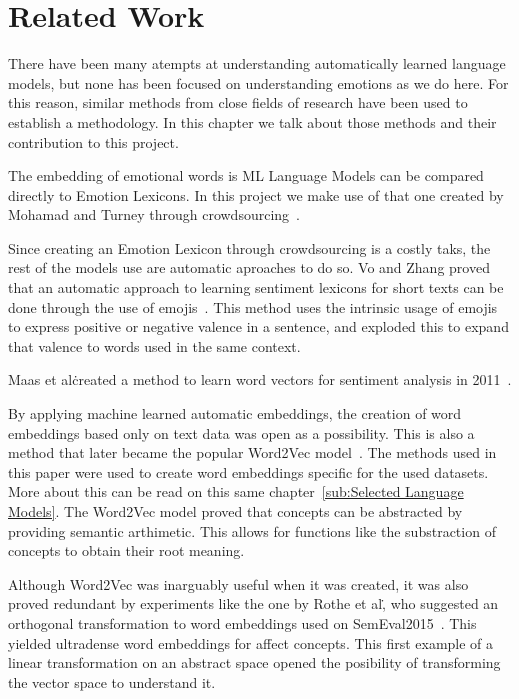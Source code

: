\chapter{Related Work}\label{chap:Related Work}

There have been many atempts at understanding automatically learned language models, but none has been focused on understanding emotions as we do here. For this reason, similar methods from close fields of research have been used to establish a methodology. In this chapter we talk about those methods and their contribution to this project.

The embedding of emotional words is ML Language Models can be compared directly to Emotion Lexicons. In this project we make use of that one created by Mohamad and Turney through crowdsourcing~\cite{mohammad2013crowdsourcing}.

Since creating an Emotion Lexicon through crowdsourcing is a costly taks, the rest of the models use are automatic aproaches to do so. Vo and Zhang proved that an automatic approach to learning sentiment lexicons for short texts can be done through the use of emojis~\cite{vo2016count}. This method uses the intrinsic usage of emojis to express positive or negative valence in a sentence, and exploded this to expand that valence to words used in the same context.

Maas et al\. created a method to learn word vectors for sentiment analysis in 2011~\cite{maas2011learning}.

By applying machine learned automatic embeddings, the creation of word embeddings based only on text data was open as a possibility. This is also a method that later became the popular Word2Vec model~\cite{mikolov2013word2vec}. The methods used in this paper were used to create word embeddings specific for the used datasets. More about this can be read on this same chapter~\ref{sub:Selected Language Models}. The Word2Vec model proved that concepts can be abstracted by providing semantic arthimetic. This allows for functions like the substraction of concepts to obtain their root meaning.

Although Word2Vec was inarguably useful when it was created, it was also proved redundant by experiments like the one by Rothe et al\., who suggested an orthogonal transformation to word embeddings used on SemEval2015~\cite{rothe2016orthogonal}. This yielded ultradense word embeddings for affect concepts. This first example of a linear transformation on an abstract space opened the posibility of transforming the vector space to understand it.

